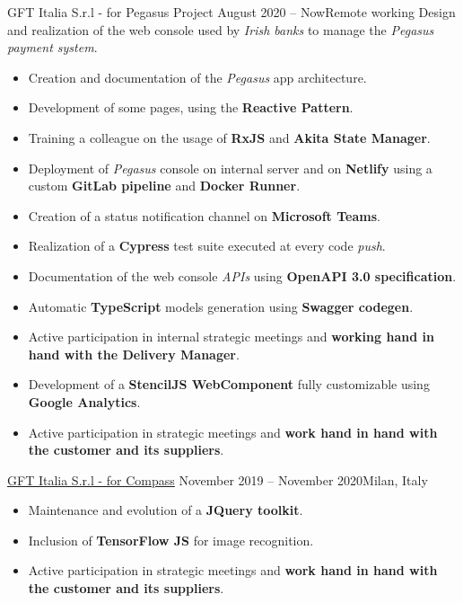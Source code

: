 \documentclass[10pt,a4paper]{altacv}
\begin{document}
{GFT Italia S.r.l - for Pegasus Project}
{August 2020 -- Now}{Remote working}
Design and realization of the web console used by \textit{Irish banks} to manage the \textit{Pegasus payment system}.
\newline
\begin{itemize}
	\item Creation and documentation of the \textit{Pegasus} app architecture.
	\item Development of some pages, using the \textbf{Reactive Pattern}.
	\item Training a colleague on the usage of \textbf{RxJS} and \textbf{Akita State Manager}.
	\item Deployment of \textit{Pegasus} console on internal server and on \textbf{Netlify} using a custom \textbf{GitLab pipeline} and \textbf{Docker Runner}.
	\item Creation of a status notification channel on \textbf{Microsoft Teams}.
	\item Realization of a \textbf{Cypress} test suite executed at every code \textit{push}.
	\item Documentation of the web console \textit{APIs} using \textbf{OpenAPI 3.0 specification}.
	\item Automatic \textbf{TypeScript} models generation using \textbf{Swagger codegen}.
	\item Active participation in internal strategic meetings and \textbf{working hand in hand with the Delivery Manager}.
\end{itemize}
\divider

{\marginpar{\vspace*{-3em}\raggedright}}
\begin{itemize}
	\item Development of a \textbf{StencilJS WebComponent} fully customizable using \textbf{Google Analytics}.
	\item Active participation in strategic meetings and \textbf{work hand in hand with the customer and its suppliers}.
\end{itemize}

\divider

{\href{https://www.compass.it/}{GFT Italia S.r.l - for Compass}}
{November 2019 -- November 2020}{Milan, Italy}
\begin{itemize}
	\item Maintenance and evolution of a \textbf{JQuery toolkit}.
	\item Inclusion of \textbf{TensorFlow JS} for image recognition.
	\item Active participation in strategic meetings and \textbf{work hand in hand with the customer and its suppliers}.
\end{itemize}
\end{document}
